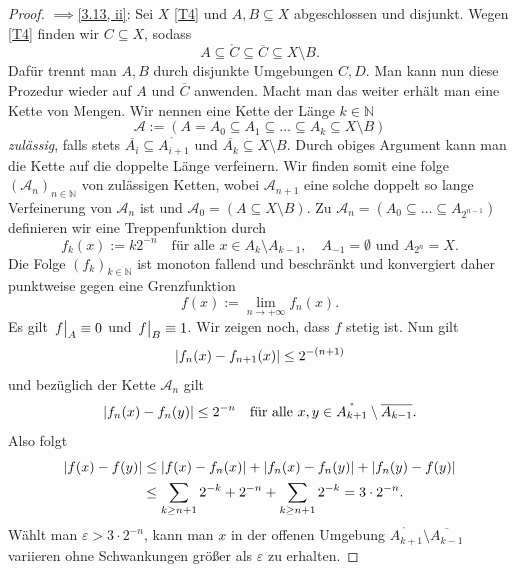 \documentclass[
12pt, 
openany, 
a4paper, 
final,
fleqn, 
]{myclass}
\numberwithin{equation}{chapter}
\numberwithin{section}{chapter}
\newcommand{\implication}[2]{\glqq {#1}$\implies${#2}\grqq}
\newcommand{\closure}[1]{\overline{#1}}
\newcommand{\interior}[1]{\mathring{#1}}
\newcommand{\eval}[1]{\left. \vphantom{\int}#1\right\lvert}
\DeclarePairedDelimiter{\abs}{\lvert}{\rvert}
\begin{document}
\begin{proof}
\implication{\ref{3.13, i}}{\ref{3.13, ii}}: Sei $ X $ \ref{T4} und $ A, B\subseteq X$ abgeschlossen und disjunkt. Wegen \ref{T4} finden wir $ C\subseteq X $, sodass
\[
A \subseteq \interior{C}\subseteq \closure{C} \subseteq X\setminus B.
\]
Dafür trennt man $ A, B $ durch disjunkte Umgebungen $C, D$. Man kann nun diese Prozedur wieder auf $ A $ und $ \closure{C} $ anwenden. Macht man das weiter erhält man eine Kette von Mengen.  Wir nennen eine Kette der Länge $ k\in \mathbb{N} $
\[
\mathcal{A} := (A=A_{0}\subseteq A_{1}\subseteq \dots \subseteq A_{k}\subseteq X\setminus B)
\]
\emph{zulässig}, falls stets $ \closure{A_{i}}\subseteq \interior{A_{i+1}} $ und $ \closure{A_{k}}\subseteq  X\setminus B$. Durch obiges Argument kann man die Kette auf die doppelte Länge verfeinern. Wir finden somit eine folge $ (\mathcal{A}_{n})_{n\in \mathbb{N}} $ von zulässigen Ketten, wobei $ \mathcal{A}_{n+1} $ eine solche doppelt so lange Verfeinerung von $ \mathcal{A}_{n} $ ist und $ \mathcal{A}_{0} = (A\subseteq X\setminus B) $. Zu $ \mathcal{A}_{n} =(A_{0}\subseteq \dots \subseteq A_{2^{n-1}})$ definieren wir eine Treppenfunktion durch 
\[
f_{k}(x) := k2^{-n}\quad \text{für alle }x\in A_{k}\setminus A_{k-1}, \quad A_{-1}=\emptyset \text{ und } A_{2^n} = X.
\]
Die Folge $ (f_{k})_{k\in \mathbb{N}} $ ist monoton fallend und beschränkt und konvergiert daher punktweise gegen eine Grenzfunktion
\[
f(x) := \lim_{n\to+\infty} f_{n}(x).
\]
Es gilt $\eval{f}_{A} \equiv 0 $ und $ \eval{f}_{B} \equiv 1 $. Wir zeigen noch, dass $ f $ stetig ist. Nun gilt
\[
\abs{f_{n}(x)- f_{n+1}(x)} \leq 2^{-(n+1)}
\]
und bezüglich der Kette $ \mathcal{A}_{n} $ gilt
\[
\abs{f_{n}(x) - f_{n}(y)}\leq 2^{-n}\quad \text{für alle $ x, y\in \interior{A_{k+1}}\setminus \closure{A_{k-1}} $}. 
\]
Also folgt 
\begin{align*}
\abs{f(x) - f(y)} 
&
\leq \abs{f(x) - f_{n}(x)} + \abs{f_{n}(x) - f_{n}(y)} + \abs{f_{n}(y)- f(y)}\\
&
\leq \sum_{k\geq n+1} 2^{-k} + 2^{-n} + \sum_{k\geq n+1}2^{-k} = 3\cdot 2^{-n}.  
\end{align*}
Wählt man $ \varepsilon> 3\cdot 2^{-n} $, kann man $ x $ in der offenen Umgebung $ \interior{A_{k+1}}\setminus \closure{A_{k-1}} $ variieren ohne Schwankungen größer als $ \varepsilon $ zu erhalten.


\end{proof}
\end{document}
